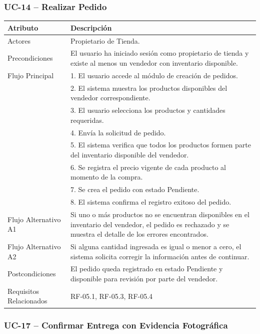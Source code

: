 \documentclass[12pt,a4paper]{report}
\begin{document}
\subsubsection{UC-14 -- Realizar Pedido}

\begin{longtable}{|p{4cm}|p{10cm}|}
\hline
\textbf{Atributo} & \textbf{Descripción} \\ \hline
Actores & Propietario de Tienda. \\ \hline
Precondiciones & El usuario ha iniciado sesión como propietario de tienda y existe al menos un vendedor con inventario disponible. \\ \hline
Flujo Principal &
1. El usuario accede al módulo de creación de pedidos.\\
& 2. El sistema muestra los productos disponibles del vendedor correspondiente.\\
& 3. El usuario selecciona los productos y cantidades requeridas.\\
& 4. Envía la solicitud de pedido.\\
& 5. El sistema verifica que todos los productos formen parte del inventario disponible del vendedor.\\
& 6. Se registra el precio vigente de cada producto al momento de la compra.\\
& 7. Se crea el pedido con estado Pendiente.\\
& 8. El sistema confirma el registro exitoso del pedido. \\ \hline
Flujo Alternativo A1 & Si uno o más productos no se encuentran disponibles en el inventario del vendedor, el pedido es rechazado y se muestra el detalle de los errores encontrados. \\ \hline
Flujo Alternativo A2 & Si alguna cantidad ingresada es igual o menor a cero, el sistema solicita corregir la información antes de continuar. \\ \hline
Postcondiciones & El pedido queda registrado en estado Pendiente y disponible para revisión por parte del vendedor. \\ \hline
Requisitos Relacionados & RF-05.1, RF-05.3, RF-05.4 \\ \hline
\end{longtable}


\subsubsection{UC-17 -- Confirmar Entrega con Evidencia Fotográfica}
\end{document}
